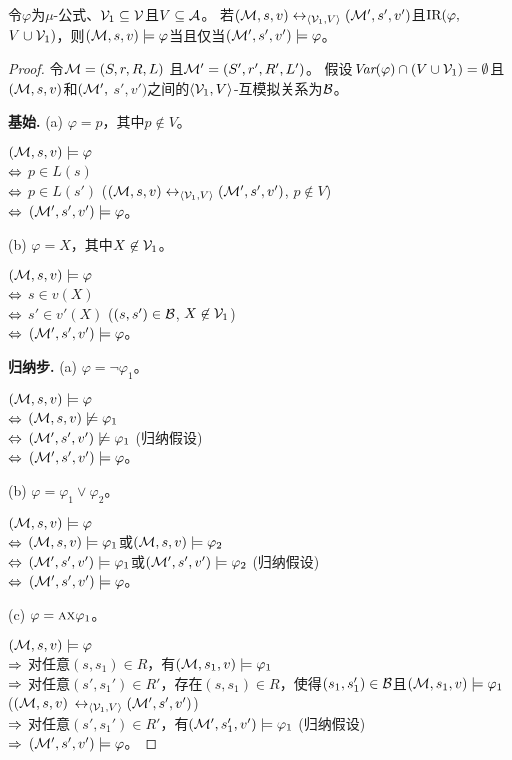 \begin{proposition}[不变性]
	\label{pro:variB}
	令$\varphi$为$\mu$-公式、${\cal V}_1\subseteq {\cal V}$且$V\subseteq {\cal A}$。 若$({\cal M}, s, v) \leftrightarrow_{{\langle{{\cal V}_1, V}\rangle}} ({\cal M}', s', v')$且$\textrm{IR}(\varphi,$ $ V \cup {\cal V}_1)$，则$({\cal M},s, v) \models \varphi$当且仅当$({\cal M}',s', v') \models \varphi$。
\end{proposition}
\begin{proof}
	令${\cal M}=(S,r,R,L)$ 且${\cal M}'=(S',r',R',L')$。
假设$\textit{Var}(\varphi) \cap (V\cup {\cal V}_1) = \emptyset$且$({\cal M}, s, v)$和$({\cal M}',$ $ s', v')$之间的${{\langle{{\cal V}_1, V}\rangle}}$-互模拟关系为${\cal B}$。
	
	\textbf{基始.} (a) $\varphi = p$，其中$p\not \in V$。
	
	$({\cal M},s,v) \models \varphi$\\
	$\Leftrightarrow$ $p \in L(s)$ \\
	$\Leftrightarrow$ $p\in L(s')$ \hfill ($({\cal M}, s, v) \leftrightarrow_{{\langle{{\cal V}_1, V}\rangle}} ({\cal M}', s', v')$, $p \not \in V$)\\
	$\Leftrightarrow$ $({\cal M}',s',v') \models \varphi$。
	
	(b) $\varphi = X$，其中$X \not \in {\cal V}_1$。
	
	$({\cal M},s, v)\models \varphi$ \\
	$\Leftrightarrow$ $s \in v(X)$ \\
	$\Leftrightarrow$ $s' \in v'(X)$ \hfill ($(s,s')\in {\cal B}$, $X\not \in {\cal V}_1$)\\
	$\Leftrightarrow$ $({\cal M}',s',v') \models \varphi$。
	
	\textbf{归纳步.} (a) $\varphi = \neg \varphi_1$。
	
	$({\cal M},s,v) \models \varphi$\\
	$\Leftrightarrow$ $({\cal M},s,v) \not \models \varphi_1$\\
	$\Leftrightarrow$ $({\cal M}',s',v') \not \models \varphi_1$ \hfill (归纳假设)\\
	$\Leftrightarrow$ $({\cal M}',s',v') \models \varphi$。
	
	(b) $\varphi = \varphi_1 \vee \varphi_2$。
	
	$({\cal M},s,v) \models \varphi$\\
	$\Leftrightarrow$ $({\cal M},s,v) \models \varphi_1$或$({\cal M},s,v)\models \varphi_2$ \\
	$\Leftrightarrow$ $({\cal M}',s',v') \models \varphi_1$或$({\cal M}',s',v') \models \varphi_2$ \hfill (归纳假设)\\
	$\Leftrightarrow$ $({\cal M}',s',v')\models \varphi$。
	
	(c)  $\varphi = \textsc{a}\textsc{x} \varphi_1$。
	
	$({\cal M},s,v) \models \varphi$\\
	$\Rightarrow$ 对任意$(s, s_1)\in R$，有$({\cal M},s_1,v) \models \varphi_1$\\
	$\Rightarrow$ 对任意$(s',s_1') \in R'$，存在$(s,s_1) \in R$，使得$(s_1,s_1') \in {\cal B}$且$({\cal M},s_1,v) \models \varphi_1$ \qquad ($({\cal M}, s, v)$ $\leftrightarrow_{{\langle{{\cal V}_1, V}\rangle}} ({\cal M}', s', v')$)\\
	$\Rightarrow$ 对任意$(s',s_1') \in R'$，有$({\cal M}',s_1',v')\models \varphi_1$  \hfill (归纳假设)\\
	$\Rightarrow$ $({\cal M}',s',v')\models \varphi$。
	

\end{proof}
